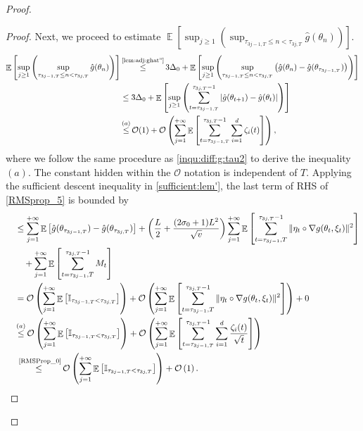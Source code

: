 \documentclass[standalone]{article}
\newcommand{\I}{\mathbb{I}}
\DeclareMathOperator{\Expect}{\mathbb{E}}
\begin{document}
\begin{proof}
\begin{proof}
Next, we proceed to estimate \(\Expect\left[\sup_{j\ge 1}\left(\sup_{\tau_{3j-1,T}\le n<\tau_{3j,T}}\hat{g}(\theta_{n})\right)\right]\).
\begin{align}\label{RMSprop_5}
 \Expect\left[\sup_{j\ge 1}\left(\sup_{\tau_{3j-1,T}\le n<\tau_{3j,T}}\hat{g}(\theta_{n})\right)\right]& \mathop{\le}^{\text{\cref{lem:adj:ghat''}}}  3\Delta_{0}+  \Expect\left[\sup_{j\ge 1}\left(\sup_{\tau_{3j-1,T}\le n<\tau_{3j,T}}\left(\hat{g}(\theta_{n})-\hat{g}(\theta_{\tau_{3j-1,T}})\right)\right)\right]\notag\\&\le 3\Delta_{0}+  \Expect\left[\sup_{j\ge 1}\left(\sum_{t=\tau_{3j-1,T}}^{\tau_{3j,T}-1}\left|\hat{g}(\theta_{t+1})-\hat{g}(\theta_{t})\right|\right)\right]\notag\\& \mathop{\le}^{(a)} \mathcal{O}(1)+\mathcal{O}\left(\sum_{j=1}^{+\infty}\Expect\left[\sum_{t=\tau_{3j-1,T}}^{\tau_{3j,T}-1}\sum_{i=1}^{d}\zeta_{i}(t)\right]\right),
\end{align}
where we follow the same procedure as \cref{inqu:diff:g:tau2} to derive the inequality $(a)$. The constant hidden within the \(\mathcal{O}\) notation is independent of \(T\). Applying the sufficient descent inequality in \cref{sufficient:lem'}, the last term of RHS of \cref{RMSprop_5} is bounded by
\begin{align}\label{RMSprop_6}
\quad & \leq \sum_{j=1}^{+\infty}\Expect\left[\hat{g}(\theta_{\tau_{3j-1,T}})-\hat{g}(\theta_{\tau_{3j,T}})\right]+\left(\frac{ L}{2}+\frac{(2\sigma_{0}+1) L^{2}}{\sqrt{v}}\right)\sum_{j=1}^{+\infty}\Expect\left[\sum_{t=\tau_{3j-1},T}^{\tau_{3j,T}-1}\|\eta_t\circ \nabla g(\theta_{t},\xi_{t})\|^{2}\right] \notag \\
& \quad +\sum_{j=1}^{+\infty}\Expect\left[\sum_{t=\tau_{3j-1},T}^{\tau_{3j,T}-1}M_{t}\right]\notag\\&=\mathcal{O}\left(\sum_{j=1}^{+\infty}\Expect\left[\I_{\tau_{3j-1,T}<\tau_{3j,T}}\right]\right)+\mathcal{O}\left(\sum_{j=1}^{+\infty}\Expect\left[\sum_{t=\tau_{3j-1},T}^{\tau_{3j,T}-1}\|\eta_t\circ \nabla g(\theta_{t},\xi_{t})\|^{2}\right]\right)+0\notag\\&\mathop{\le}^{(a)}\mathcal{O}\left(\sum_{j=1}^{+\infty}\Expect\left[\I_{\tau_{3j-1,T}<\tau_{3j,T}}\right]\right)+\mathcal{O}\left(\sum_{j=1}^{+\infty}\Expect\left[\sum_{t=\tau_{3j-1,T}}^{\tau_{3j,T}-1}\sum_{i=1}^{d}\frac{\zeta_{i}(t)}{\sqrt{t}}\right]\right)\notag\\&\mathop{\le}^{\text{ \cref{RMSProp_0}}}\mathcal{O}\left(\sum_{j=1}^{+\infty}\Expect\left[\I_{\tau_{3j-1,T}<\tau_{3j,T}}\right]\right)+\mathcal{O}\left(1\right).   

\end{align}
\end{proof}
\end{proof}
\end{document}
